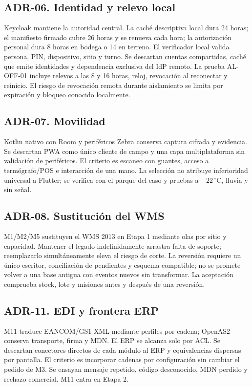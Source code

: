 \subsection*{ADR-06. Identidad y relevo local}
Keycloak mantiene la autoridad central. La caché descriptiva local dura 24 horas; el manifiesto firmado cubre 26 horas y se renueva cada hora; la autorización personal dura 8 horas en bodega o 14 en terreno. El verificador local valida persona, PIN, dispositivo, sitio y turno. Se descartan cuentas compartidas, caché que emite identidades y dependencia exclusiva del IdP remoto. La prueba AL-OFF-01 incluye relevos a las 8 y 16 horas, reloj, revocación al reconectar y reinicio. El riesgo de revocación remota durante aislamiento se limita por expiración y bloqueo conocido localmente.

\subsection*{ADR-07. Movilidad}
Kotlin nativo con Room y periféricos Zebra conserva captura cifrada y evidencia. Se descartan PWA como único cliente de campo y una capa multiplataforma sin validación de periféricos. El criterio es escaneo con guantes, acceso a termógrafo/POS e interacción de una mano. La selección no atribuye inferioridad universal a Flutter; se verifica con el parque del caso y pruebas a $-22\,^\circ$C, lluvia y sin señal.

\subsection*{ADR-08. Sustitución del WMS}
M1/M2/M5 sustituyen el WMS 2013 en Etapa 1 mediante olas por sitio y capacidad. Mantener el legado indefinidamente arrastra falta de soporte; reemplazarlo simultáneamente eleva el riesgo de corte. La reversión requiere un único escritor, conciliación de pendientes y esquema compatible; no se promete volver a una base antigua con eventos nuevos sin transformar. La aceptación comprueba stock, lote y misiones antes y después de una reversión.

\subsection*{ADR-11. EDI y frontera ERP}
M11 traduce EANCOM/GS1 XML mediante perfiles por cadena; OpenAS2 conserva transporte, firma y MDN. El ERP se alcanza solo por ACL. Se descartan conectores directos de cada módulo al ERP y equivalencias dispersas por pantalla. El criterio es incorporar cadenas por configuración sin cambiar el pedido de M3. Se ensayan mensaje repetido, código desconocido, MDN perdido y rechazo comercial. M11 entra en Etapa 2.

